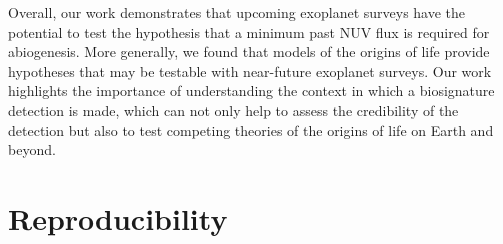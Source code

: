 \documentclass[twocolumn,twocolappendix,linenumbers]{aastex631}
\begin{document}
Overall, our work demonstrates that upcoming exoplanet surveys have the potential to test the hypothesis that a minimum past \gls{NUV} flux is required for abiogenesis.
More generally, we found that models of the origins of life provide hypotheses that may be testable with near-future exoplanet surveys.
Our work highlights the importance of understanding the context in which a biosignature detection is made, which can not only help to assess the credibility of the detection but also to test competing theories of the origins of life on Earth and beyond.

%

\section*{Reproducibility}


\end{document}

